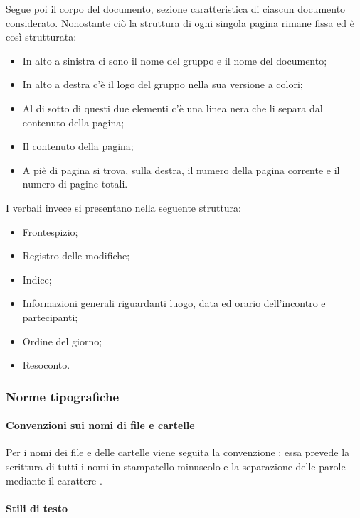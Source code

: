 Segue poi il corpo del documento, sezione caratteristica di ciascun documento considerato. Nonostante ciò la struttura 
di ogni singola pagina rimane fissa ed è così strutturata:
\begin{itemize}
    \item In alto a sinistra ci sono il nome del gruppo e il nome del documento;
    \item In alto a destra c'è il logo del gruppo nella sua versione a colori;
    \item Al di sotto di questi due elementi c'è una linea nera che li separa dal contenuto della pagina;
    \item Il contenuto della pagina;
    \item A piè di pagina si trova, sulla destra, il numero della pagina corrente e il numero di pagine totali.
\end{itemize}
I verbali invece si presentano nella seguente struttura:
\begin{itemize}
    \item Frontespizio;
    \item Registro delle modifiche;
    \item Indice;
    \item Informazioni generali riguardanti luogo, data ed orario dell'incontro e partecipanti;
    \item Ordine del giorno;
    \item Resoconto.
\end{itemize}

\subsubsection{Norme tipografiche}
\label{ssub:norme_tipografiche}

\paragraph{Convenzioni sui nomi di file e cartelle}
\label{par:attribuzione_nome}

Per i nomi dei file e delle cartelle viene seguita la convenzione ; essa prevede la scrittura di tutti i nomi in stampatello 
minuscolo e la separazione delle parole mediante il carattere .

\paragraph{Stili di testo}
\label{par:stili_testo}

